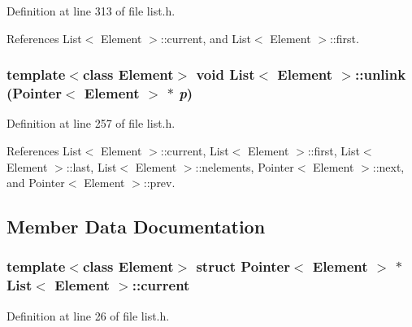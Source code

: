 Definition at line 313 of file list.h.

References List$<$ Element $>$::current, and List$<$ Element $>$::first.\hypertarget{classList_adc4059521dfe0939e87da556ad566c5}{
\subsubsection[{unlink}]{\setlength{\rightskip}{0pt plus 5cm}template$<$class Element$>$ void {\bf List}$<$ Element $>$::unlink ({\bf Pointer}$<$ Element $>$ $\ast$ {\em p})}}
\label{classList_adc4059521dfe0939e87da556ad566c5}




Definition at line 257 of file list.h.

References List$<$ Element $>$::current, List$<$ Element $>$::first, List$<$ Element $>$::last, List$<$ Element $>$::nelements, Pointer$<$ Element $>$::next, and Pointer$<$ Element $>$::prev.

\subsection{Member Data Documentation}
\hypertarget{classList_5c6e1ded5f9bf10f79df628d7970390f}{
\subsubsection[{current}]{\setlength{\rightskip}{0pt plus 5cm}template$<$class Element$>$ struct {\bf Pointer}$<$ Element $>$ $\ast$ {\bf List}$<$ Element $>$::{\bf current}}}
\label{classList_5c6e1ded5f9bf10f79df628d7970390f}




Definition at line 26 of file list.h.

